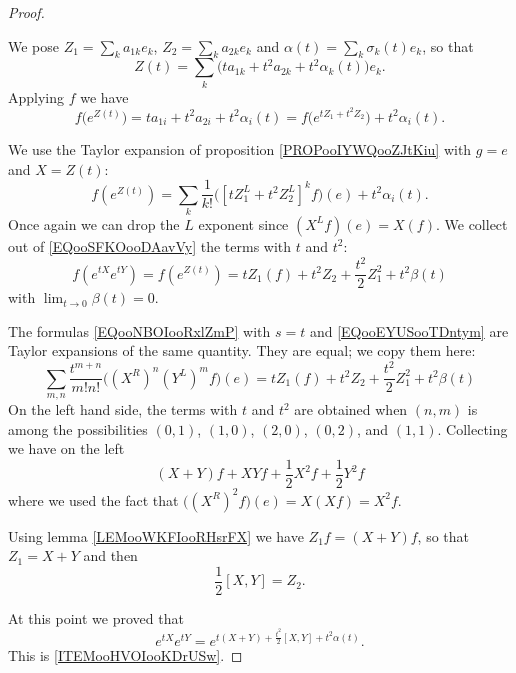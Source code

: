 \begin{proof}
\begin{subproof}

		We pose \( Z_1=\sum_ka_{1k}e_k\), \( Z_2=\sum_ka_{2k}e_k\) and \( \alpha(t)=\sum_k\sigma_k(t)e_k\), so that
		\begin{equation}
			Z(t)=\sum_k\big( ta_{1k}+t^2a_{2k}+t^2\alpha_k(t) \big)e_k.
		\end{equation}
		Applying \( f\) we have
		\begin{equation}
			f\big(  e^{Z(t)} \big)=ta_{1i}+t^2a_{2i}+t^2\alpha_i(t)=f\big(  e^{tZ_1+t^2Z_2} \big)+t^2\alpha_i(t).
		\end{equation}


		We use the Taylor expansion of proposition \ref{PROPooIYWQooZJtKiu} with \( g=e\) and \( X=Z(t)\):
		\begin{equation}        \label{EQooSFKOooDAavVy}
			f( e^{Z(t)})=\sum_k\frac{1}{ k! }\big( [tZ^L_1+t^2Z_2^L]^kf \big)(e)+t^2\alpha_i(t).
		\end{equation}
		Once again we can drop the \( L\) exponent since \( (X^Lf)(e)=X(f)\). We collect out of \eqref{EQooSFKOooDAavVy} the terms with \( t\) and \( t^2\):
		\begin{equation}        \label{EQooEYUSooTDntym}
			f( e^{tX} e^{tY})=f( e^{Z(t)})=tZ_1(f)+t^2 Z_2 +\frac{ t^2 }{2}Z_1^2 +t^2\beta(t)
		\end{equation}
		with \( \lim_{t\to 0} \beta(t)=0\).

		\spitem[Comparison]

		The formulas \eqref{EQooNBOIooRxlZmP} with \( s=t\) and \eqref{EQooEYUSooTDntym} are Taylor expansions of the same quantity. They are equal; we copy them here:
		\begin{equation}
			\sum_{m,n}\frac{ t^{m+n} }{ m!n! }\big( (X^R)^n(Y^L)^mf \big)(e)=tZ_1(f)+t^2 Z_2 +\frac{ t^2 }{2}Z_1^2 +t^2\beta(t)
		\end{equation}
		On the left hand side, the terms with \( t\) and \( t^2\) are obtained when \( (n,m)\) is among the possibilities $(0,1)$, $(1,0)$, $(2,0)$, $(0,2)$, and $(1,1)$. Collecting we have on the left
		\begin{equation}
			(X+Y)f+XYf+\frac{ 1 }{2}X^2f+\frac{ 1 }{2}Y^2f
		\end{equation}
		where we used the fact that \( \big( (X^R)^2f \big)(e)=X(Xf)=X^2f\).

		Using lemma \ref{LEMooWKFIooRHsrFX} we have \( Z_1f=(X+Y)f\), so that \( Z_1=X+Y\) and then
		\begin{equation}
			\frac{ 1 }{2}[X,Y]=Z_2.
		\end{equation}
	\end{subproof}
	At this point we proved that
	\begin{equation}
		e^{tX} e^{tY}= e^{t(X+Y)+\frac{ t^2 }{2}[X,Y]+t^2\alpha(t)}.
	\end{equation}
	This is \ref{ITEMooHVOIooKDrUSw}.


\end{proof}
